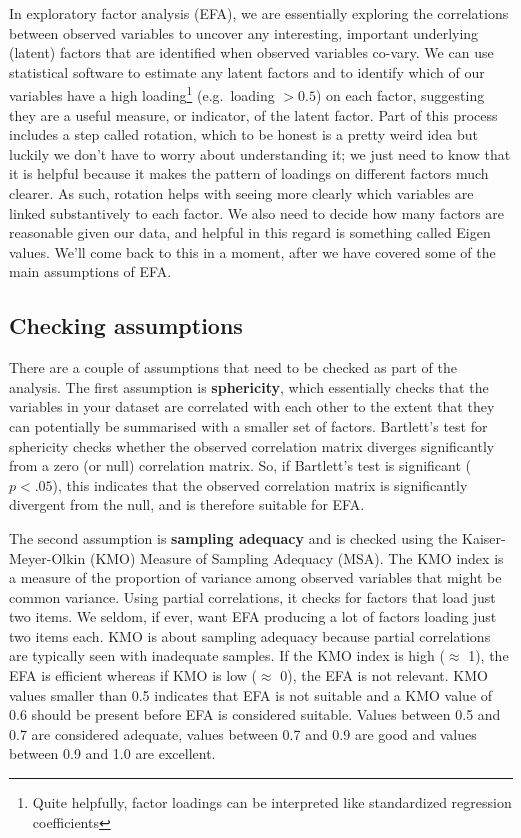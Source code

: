 \documentclass[
]{book}
\begin{document}
In exploratory factor analysis (EFA), we are essentially exploring the correlations between observed variables to uncover any interesting, important underlying (latent) factors that are identified when observed variables co-vary. We can use statistical software to estimate any latent factors and to identify which of our variables have a high loading\footnote{Quite helpfully, factor loadings can be interpreted like standardized regression coefficients} (e.g.~loading \(>0.5\)) on each factor, suggesting they are a useful measure, or indicator, of the latent factor. Part of this process includes a step called rotation, which to be honest is a pretty weird idea but luckily we don't have to worry about understanding it; we just need to know that it is helpful because it makes the pattern of loadings on different factors much clearer. As such, rotation helps with seeing more clearly which variables are linked substantively to each factor. We also need to decide how many factors are reasonable given our data, and helpful in this regard is something called Eigen values. We'll come back to this in a moment, after we have covered some of the main assumptions of EFA.

\hypertarget{checking-assumptions}{%
\subsection{Checking assumptions}\label{checking-assumptions}}

There are a couple of assumptions that need to be checked as part of the analysis. The first assumption is {\textbf{sphericity}}, which essentially checks that the variables in your dataset are correlated with each other to the extent that they can potentially be summarised with a smaller set of factors. Bartlett's test for sphericity checks whether the observed correlation matrix diverges significantly from a zero (or null) correlation matrix. So, if Bartlett's test is significant (\(p<.05\)), this indicates that the observed correlation matrix is significantly divergent from the null, and is therefore suitable for EFA.

The second assumption is {\textbf{sampling adequacy}} and is checked using the Kaiser-Meyer-Olkin (KMO) Measure of Sampling Adequacy (MSA). The KMO index is a measure of the proportion of variance among observed variables that might be common variance. Using partial correlations, it checks for factors that load just two items. We seldom, if ever, want EFA producing a lot of factors loading just two items each. KMO is about sampling adequacy because partial correlations are typically seen with inadequate samples. If the KMO index is high (\(\approx\) 1), the EFA is efficient whereas if KMO is low (\(\approx\) 0), the EFA is not relevant. KMO values smaller than 0.5 indicates that EFA is not suitable and a KMO value of 0.6 should be present before EFA is considered suitable. Values between 0.5 and 0.7 are considered adequate, values between 0.7 and 0.9 are good and values between 0.9 and 1.0 are excellent.
\end{document}
